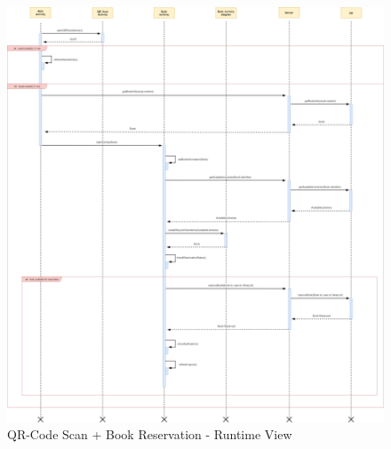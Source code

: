 \begin{figure}[H]
	\centering
	\includegraphics[scale=0.21]{Images/Runtime/user_qrcode_reserve}
	\caption{QR-Code Scan + Book Reservation - Runtime View}
\end{figure}

